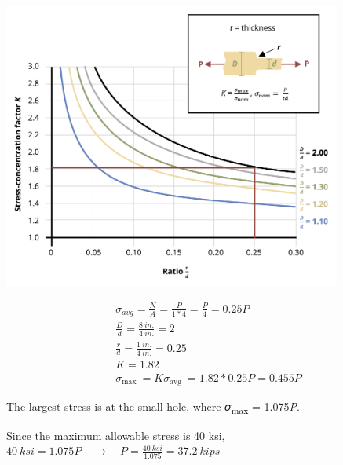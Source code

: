 \documentclass[
  letterpaper,
  DIV=11,
  numbers=noendperiod]{scrreprt}
\begin{document}
\begin{tcolorbox}
\begin{tcolorbox}
\begin{center}
\includegraphics[width=4.38542in,height=\textheight]{images/PNGs/Example 5.2 part 4.png}
\end{center}

\[
\begin{aligned}
& \sigma_{avg}=\frac{N}{A}=\frac{P}{1 * 4}=\frac{P}{4}=0.25 P \\
& \frac{D}{d}=\frac{8{~in.}}{4{~in.}}=2 \\
& \frac{r}{d}=\frac{1{~in.}}{4{~in.}}=0.25 \\
& K=1.82 \\
& \sigma_{\text {max }}=K \sigma_{\text {avg }}=1.82 * 0.25 P=0.455 P
\end{aligned}
\]

The largest stress is at the small hole, where 𝜎\textsubscript{max} =
1.075\emph{P}.

Since the maximum allowable stress is 40 ksi,
\(40{~ksi}=1.075 P \quad\rightarrow\quad P=\frac{40{~ksi}}{1.075}=37.2{~kips}\)

\end{tcolorbox}

\end{tcolorbox}
\end{document}
